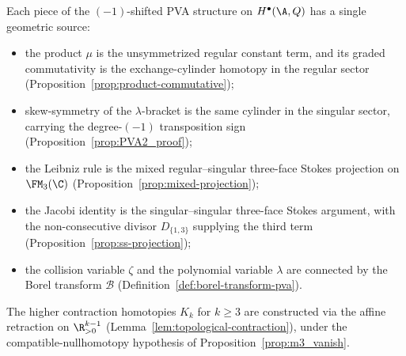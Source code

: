 \begin{summary}
\label{sum:pva-foundational-repair}
Each piece of the $(-1)$-shifted PVA structure on $H^\bullet(\A,Q)$
has a single geometric source:
\begin{itemize}
\item the product $\mu$ is the unsymmetrized regular constant term, and
 its graded commutativity is the exchange-cylinder homotopy in the
 regular sector (Proposition~\ref{prop:product-commutative});
\item skew-symmetry of the $\lambda$-bracket is the same cylinder in the
 singular sector, carrying the degree-$(-1)$ transposition sign
 (Proposition~\ref{prop:PVA2_proof});
\item the Leibniz rule is the mixed regular--singular three-face Stokes
 projection on $\FM_3(\C)$ (Proposition~\ref{prop:mixed-projection});
\item the Jacobi identity is the singular--singular three-face Stokes
 argument, with the non-consecutive divisor $D_{\{1,3\}}$ supplying the
 third term (Proposition~\ref{prop:ss-projection});
\item the collision variable $\zeta$ and the polynomial variable
 $\lambda$ are connected by the Borel transform $\mathcal B$
 (Definition~\ref{def:borel-transform-pva}).
\end{itemize}
The higher contraction homotopies $K_k$ for $k\ge3$ are constructed via
the affine retraction on $\R^{k-1}_{>0}$
(Lemma~\ref{lem:topological-contraction}), under the
compatible-nullhomotopy hypothesis of
Proposition~\ref{prop:m3_vanish}.
\end{summary}
